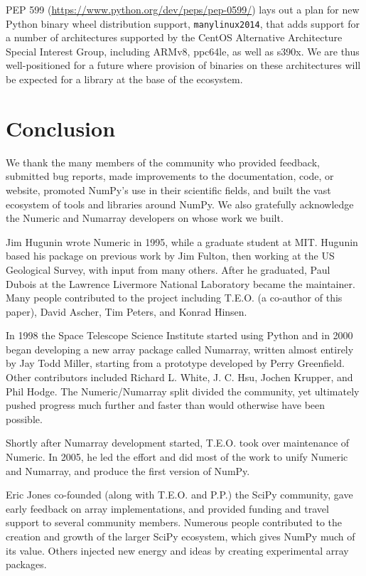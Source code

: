 PEP 599 (\url{https://www.python.org/dev/peps/pep-0599/})
lays out a plan for new Python binary wheel
distribution support, \texttt{manylinux2014}, that adds
support for a number of architectures supported by the CentOS
Alternative Architecture Special Interest Group, including
ARMv8, ppc64le, as well as s390x. We are thus well-positioned
for a future where provision of binaries on these architectures
will be expected for a library at the base of the ecosystem.

\section*{Conclusion}

We thank the many members of the community who provided
feedback, submitted bug reports, made improvements to the documentation,
code, or website, promoted NumPy's use in their scientific fields, and built
the vast ecosystem of tools and libraries around NumPy.
We also gratefully acknowledge the Numeric and Numarray developers
on whose work we built.

Jim Hugunin wrote Numeric in 1995, while a graduate student at MIT.
Hugunin based his package on previous work by Jim Fulton, then working at the
US Geological Survey, with input from many others.
After he graduated, Paul Dubois at the Lawrence Livermore National Laboratory
became the maintainer.
Many people contributed to the project including T.E.O. (a co-author
of this paper), David Ascher, Tim Peters, and Konrad Hinsen.

In 1998 the Space Telescope Science Institute started using Python
and in 2000 began developing a new array package called Numarray, written
almost entirely by Jay Todd Miller, starting from a prototype developed by
Perry Greenfield.  Other contributors included Richard L. White, J. C. Hsu,
Jochen Krupper, and Phil Hodge.
The Numeric/Numarray split divided the community, yet ultimately pushed
progress much further and faster than would otherwise have been possible.

Shortly after Numarray development started, T.E.O. took over maintenance of
Numeric. In 2005, he led the effort and did most of the work to unify Numeric
and Numarray, and produce the first version of NumPy.

Eric Jones co-founded (along with T.E.O. and P.P.) the SciPy community, gave early feedback on array
implementations, and provided funding and travel support to several
community members.
Numerous people contributed to the creation and
growth of the larger SciPy ecosystem, which gives NumPy much of its
value. Others injected new energy and ideas by creating experimental
array packages.
